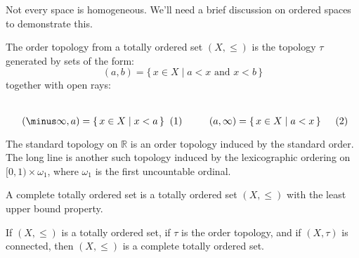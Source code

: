 \documentclass{article}                                                        %
\begin{document}
        Not every space is homogeneous. We'll need a brief discussion on
        ordered spaces to demonstrate this.
        \begin{definition}
                The order topology from a totally ordered set $(X,\leq)$ is
                the topology $\tau$ generated by sets of the form:
                \begin{equation}
                    (a,b)=\{\,x\in{X}\;|\;a<x\textrm{ and }x<b\,\}
                \end{equation}
                together with open rays:
                \par
                \begin{subequations}
                    \begin{minipage}[b]{0.49\textwidth}
                        \centering
                        \begin{equation}
                            (\minus\infty,a)=\{\,x\in{X}\;|\;x<a\,\}
                        \end{equation}
                    \end{minipage}
                    \hfill
                    \begin{minipage}[b]{0.49\textwidth}
                        \centering
                        \begin{equation}
                            (a,\infty)=\{\,x\in{X}\;|\;a<x\,\}
                        \end{equation}
                    \end{minipage}
                \end{subequations}
                \par\vspace{2.5ex}
        \end{definition}
        \begin{example}
                The standard topology on $\mathbb{R}$ is an order topology
                induced by the standard order. The long line is another such
                topology induced by the lexicographic ordering on
                $[0,1)\times\omega_{1}$, where $\omega_{1}$ is the first
                uncountable ordinal.
        \end{example}
        \begin{definition}
                A complete totally ordered set is a totally ordered set
                $(X,\leq)$ with the least upper bound property.
        \end{definition}
        \begin{theorem}
                If $(X,\leq)$ is a totally ordered set, if $\tau$ is the order
                topology, and if $(X,\tau)$ is connected, then $(X,\leq)$ is
                a complete totally ordered set.
        \end{theorem}
\end{document}

